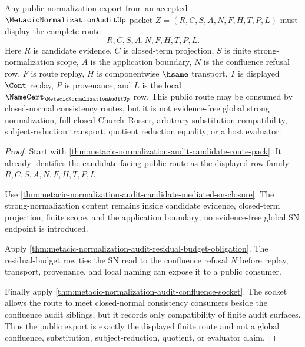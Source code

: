 \begin{theorem}
\label{thm:metacic-normalization-audit-public-route}
Any public normalization export from an accepted $\MetacicNormalizationAuditUp$ packet $Z=(R,C,S,A,N,F,H,T,P,L)$ must display the complete route
$$
R,C,S,A,N,F,H,T,P,L .
$$
Here $R$ is candidate evidence, $C$ is closed-term projection, $S$ is finite strong-normalization scope, $A$ is the application boundary, $N$ is the confluence refusal row, $F$ is route replay, $H$ is componentwise $\hsame$ transport, $T$ is displayed $\Cont$ replay, $P$ is provenance, and $L$ is the local $\NameCert_{\MetacicNormalizationAuditUp}$ row. This public route may be consumed by closed-normal consistency routes, but it is not evidence-free global strong normalization, full closed Church--Rosser, arbitrary substitution compatibility, subject-reduction transport, quotient reduction equality, or a host evaluator.
\end{theorem}
\begin{proof}
Start with \autoref{thm:metacic-normalization-audit-candidate-route-pack}. It already identifies the candidate-facing public route as the displayed row family $R,C,S,A,N,F,H,T,P,L$.

Use \autoref{thm:metacic-normalization-audit-candidate-mediated-sn-closure}. The strong-normalization content remains inside candidate evidence, closed-term projection, finite scope, and the application boundary; no evidence-free global SN endpoint is introduced.

Apply \autoref{thm:metacic-normalization-audit-residual-budget-obligation}. The residual-budget row ties the SN read to the confluence refusal $N$ before replay, transport, provenance, and local naming can expose it to a public consumer.

Finally apply \autoref{thm:metacic-normalization-audit-confluence-socket}. The socket allows the route to meet closed-normal consistency consumers beside the confluence audit siblings, but it records only compatibility of finite audit surfaces. Thus the public export is exactly the displayed finite route and not a global confluence, substitution, subject-reduction, quotient, or evaluator claim.
\end{proof}

